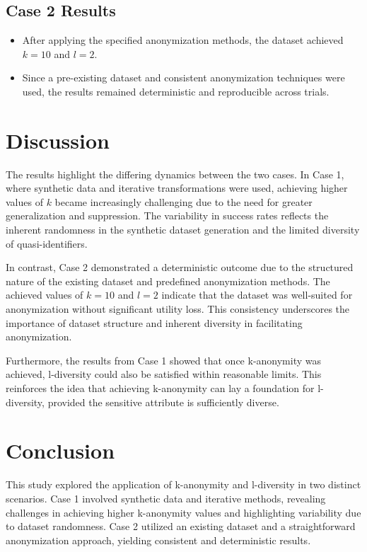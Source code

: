 \documentclass[conference]{IEEEtran}
\begin{document}
\subsection{Case 2 Results}
\begin{itemize}
	\item After applying the specified anonymization methods, the dataset achieved $k=10$ and $l=2$.
	\item Since a pre-existing dataset and consistent anonymization techniques were used, the results remained deterministic and reproducible across trials.
\end{itemize}

\section{Discussion}
The results highlight the differing dynamics between the two cases. In Case 1, where synthetic data and iterative transformations were used, achieving higher values of $k$ became increasingly challenging due to the need for greater generalization and suppression. The variability in success rates reflects the inherent randomness in the synthetic dataset generation and the limited diversity of quasi-identifiers.

In contrast, Case 2 demonstrated a deterministic outcome due to the structured nature of the existing dataset and predefined anonymization methods. The achieved values of $k=10$ and $l=2$ indicate that the dataset was well-suited for anonymization without significant utility loss. This consistency underscores the importance of dataset structure and inherent diversity in facilitating anonymization.

Furthermore, the results from Case 1 showed that once k-anonymity was achieved, l-diversity could also be satisfied within reasonable limits. This reinforces the idea that achieving k-anonymity can lay a foundation for l-diversity, provided the sensitive attribute is sufficiently diverse.

\section{Conclusion}
This study explored the application of k-anonymity and l-diversity in two distinct scenarios. Case 1 involved synthetic data and iterative methods, revealing challenges in achieving higher k-anonymity values and highlighting variability due to dataset randomness. Case 2 utilized an existing dataset and a straightforward anonymization approach, yielding consistent and deterministic results.
\end{document}
